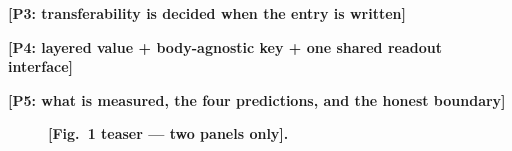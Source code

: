 \documentclass[letterpaper, 10 pt, conference]{ieeeconf}
\newcommand{\todo}[1]{\textbf{[#1]}}
\begin{document}
\todo{P3: transferability is decided when the entry is written}

\todo{P4: layered value + body-agnostic key + one shared readout interface}

\todo{P5: what is measured, the four predictions, and the honest boundary}

\begin{figure}[t]
  \centering
  \caption{\textbf{\todo{Fig.~1 teaser --- two panels only}.}
  }
  \label{fig:teaser}
\end{figure}
\end{document}
